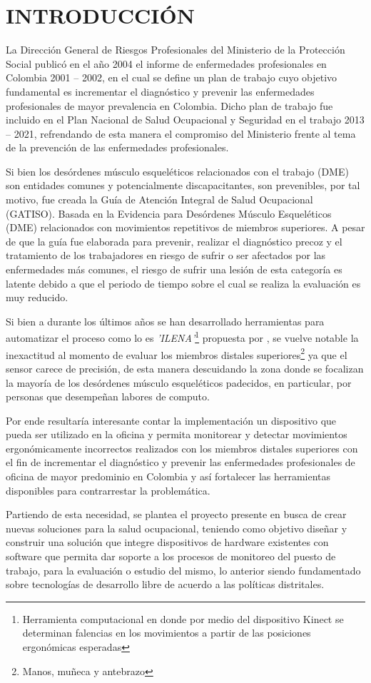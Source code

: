\newpage
\chapter{INTRODUCCIÓN} 
La Dirección General de Riesgos Profesionales del Ministerio de la Protección Social publicó en el año 2004 el informe de enfermedades profesionales en Colombia 2001 – 2002, en el cual se define un plan de trabajo cuyo objetivo fundamental es incrementar el diagnóstico y prevenir las enfermedades profesionales de mayor prevalencia en Colombia. Dicho plan de trabajo fue incluido en el Plan Nacional de Salud Ocupacional y Seguridad en el trabajo 2013 – 2021, refrendando de esta manera el compromiso del Ministerio frente al tema de la prevención de las enfermedades profesionales.

Si bien los desórdenes músculo esqueléticos relacionados con el trabajo (DME) son entidades comunes y potencialmente discapacitantes, son prevenibles, por tal motivo, fue creada la Guía de Atención Integral de Salud Ocupacional (GATISO). Basada en la Evidencia para Desórdenes Músculo Esqueléticos (DME) relacionados con movimientos repetitivos de miembros superiores. A pesar de que la guía fue elaborada para prevenir, realizar el diagnóstico precoz y el tratamiento de los trabajadores en riesgo de sufrir o ser afectados por las enfermedades más comunes, el riesgo de sufrir una lesión de esta categoría es latente debido a que el periodo de tiempo sobre el cual se realiza la evaluación es muy reducido.

Si bien a durante los últimos años se han desarrollado herramientas para automatizar el proceso como lo es \textit{'ILENA'}\footnote{Herramienta computacional en donde por medio del dispositivo Kinect se determinan falencias en los movimientos a partir de las posiciones ergonómicas esperadas} propuesta por \parencite{Moya2015ModeloOcupacional}, se vuelve notable la inexactitud al momento de evaluar los miembros distales superiores\footnote{Manos, muñeca y antebrazo} ya que el sensor carece de precisión, de esta manera descuidando la zona donde se focalizan la mayoría de los desórdenes músculo esqueléticos padecidos, en particular, por personas que desempeñan labores de computo.

Por ende resultaría interesante contar la implementación un dispositivo que pueda ser utilizado en la oficina y permita monitorear y detectar movimientos ergonómicamente incorrectos realizados con los miembros distales superiores con el fin de incrementar el diagnóstico y prevenir las enfermedades profesionales de oficina de mayor predominio en Colombia y así fortalecer las herramientas disponibles para contrarrestar la problemática.

Partiendo de esta necesidad, se plantea el proyecto presente en busca de crear nuevas soluciones para la salud ocupacional, teniendo como objetivo diseñar y construir una solución que integre dispositivos de hardware existentes con software que permita dar soporte a los procesos de monitoreo del puesto de trabajo, para la evaluación o estudio del mismo, lo anterior siendo fundamentado sobre tecnologías de desarrollo libre de acuerdo a las políticas distritales.